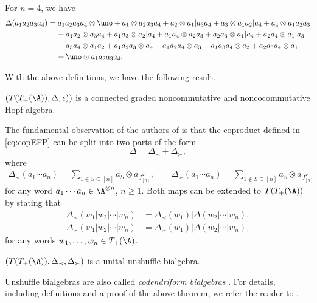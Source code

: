 \begin{Example}
For $n=4$, we have
\begin{align*}
	\Delta(a_1a_2a_3a_4)
={} & a_1a_2a_3a_4\otimes \uno + a_1 \otimes a_2a_3a_4 + a_2\otimes a_1| a_3a_4 + a_3 \otimes a_1a_2| a_4 + a_4\otimes a_1a_2a_3
	\\&\!{} + a_1a_2\otimes a_3a_4 + a_1a_3\otimes a_2|a_4 + a_1a_4\otimes a_2a_3 + a_2a_3\otimes a_1|a_4 + a_2a_4\otimes a_1|a_3
	\\&\!{} + a_3a_4\otimes a_1a_2 + a_1a_2a_3\otimes a_4 + a_1a_2a_4\otimes a_3 + a_1a_3a_4\otimes a_2 + a_2a_3a_4\otimes a_1
	\\&\!{} + \uno \otimes a_1a_2a_3a_4.
\end{align*}
\end{Example}
With the above definitions, we have the following result.

\begin{Theorem}\label{thm:HopfAlg}
$(T(T_+(\A)),\Delta,\epsilon))$ is a connected graded noncommutative and noncocommutative Hopf algebra.
\end{Theorem}

The fundamental observation of the authors of \cite{EFP1} is that the coproduct defined in \eqref{eq:copEFP} can be split into two parts of the form
\[
	\Delta = \Delta_\prec + \Delta_\succ,
\]
where
\begin{gather*}
	\Delta_\prec (a_1\cdots a_n)
	= \sum_{1\in S\subseteq [n]} a_S \otimes a_{J_{[n]}^S},\qquad
 	\Delta_\succ (a_1\cdots a_n)
	= \sum_{1\not\in S\subseteq [n]} a_S \otimes a_{J_{[n]}^S}
\end{gather*}
for any word $a_1\cdots a_n\in \A^{\otimes n}$, $n\geq 1$. Both maps can be extended to $T(T_+(\A))$ by stating that
\begin{align*}
	\Delta_\prec(w_1|w_2|\cdots |w_n)
	&= \Delta_\prec(w_1)|\Delta(w_2|\cdots|w_n),\\
	\Delta_\succ(w_1|w_2|\cdots |w_n)
	&= \Delta_\succ(w_1)|\Delta(w_2|\cdots|w_n),
\end{align*}
for any words $w_1,\dots,w_n\in T_+(\A)$.

\begin{Theorem}
\label{thm:unshuffle}
$(T(T_+(\A)),\Delta_\prec,\Delta_\succ)$ is a unital unshuffle bialgebra.
\end{Theorem}

Unshuffle bialgebras are also called \textit{codendriform bialgebras} \cite{Foissy}. For details, including definitions and a proof of the above theorem, we refer the reader to \cite[Theorem~5]{EFP1}.

